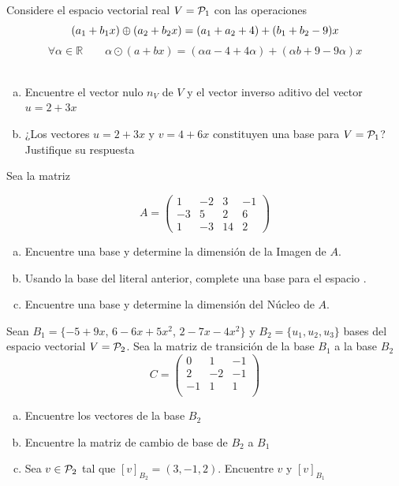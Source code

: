 \documentclass[10pt]{article}
\begin{document}
\problem{}
Considere el espacio vectorial real $V = {\cal P}_1$ con las operaciones 
\[(a_1 + b_1 x)\oplus (a_2 + b_2 x) = (a_1 + a_2 + 4) + (b_1 + b_2 - 9)x\]
\[\forall \alpha \in \mathbb{R}\qquad \alpha\odot(a + bx) = (\alpha a - 4 + 4\alpha) + (\alpha b + 9 - 9\alpha)x\]\
\begin{enumerate}[a.]
\item Encuentre el vector nulo $n_V$ de $V$ y el vector inverso aditivo del vector $u = 2 + 3x$
\item ¿Los vectores $u = 2 + 3x$ y $v = 4 + 6x$ constituyen una base para $V = {\cal P}_1$? Justifique su respuesta
\end{enumerate}

\problem{}
Sea la matriz

\[ A = \left( \begin{array}{cccc}
1 & - 2 & 3 & - 1 \\
- 3 & 5 & 2 & 6 \\
1 & - 3 & 14 & 2 \end{array} \right)\] 
\begin{enumerate}[a.]
\item Encuentre una base y determine la dimensión de la Imagen de $A$.
\item Usando la base del literal anterior, complete una base para el espacio \rtres.
\item Encuentre una base y determine la dimensión del Núcleo de $A$.

\end{enumerate}

\problem{}
Sean $B_1 = \{-5 + 9x$, $6-6x+5x^2$, $2-7x-4x^2\}$ y $B_2 = \{u_1,u_2,u_3\}$ bases del espacio vectorial $V = {\cal P}_2$. Sea la matriz de transición de la base $B_1$ a la base $B_2$
\[C=\begin{pmatrix}

0 & 1 & -1 \\
2 & -2 & -1  \\
-1 & 1 & 1  \\

\end{pmatrix}\]
\begin{enumerate}[a.]
\item Encuentre los vectores de la base $B_2$
\item Encuentre la matriz de cambio de base de $B_2$ a $B_1$
\item Sea $v \in {\cal P}_2 $ tal que $[v]_{B_2} = (3,-1,2)$. Encuentre $v$ y $[v]_{B_1}$

\end{enumerate}
\end{document}
